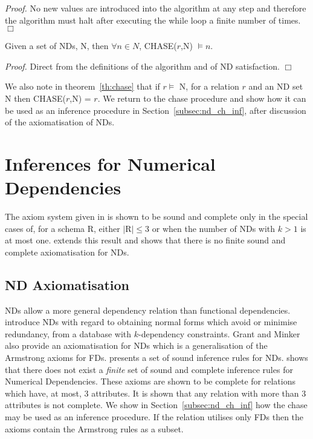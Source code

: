 {\em Proof.} No new values are introduced into the algorithm at any
step and therefore the algorithm must halt after executing the while
loop a finite number of times. $\Box$

\begin{theorem}\label{th:chase}
\begin{rm}
Given a set of NDs, N, then $\forall n \in N$, CHASE($r$,N) $\models n$.
\end{rm}
\end{theorem}

{\em Proof.} Direct from the definitions of the algorithm and of ND
satisfaction. $\Box$

We also note in theorem~\ref{th:chase} that if $r \models$ N, for a
relation $r$ and an ND set N then CHASE($r$,N) = $r$.
We return to the chase procedure and show how it can be used as an
inference procedure in Section~\ref{subsec:nd_ch_inf}, after discussion of the
axiomatisation of NDs.   

\section{Inferences for Numerical Dependencies}\label{sec:nd_inf}

The axiom system given in \cite{gm85a} is shown to be sound and
complete only in the special cases of, for a schema R, either $|$R$| \le 3$ or when the number of
NDs with $k > 1$ is at most one. \cite{gm85b} extends this result
and shows that there is no finite sound and complete
axiomatisation for NDs. 

\subsection{ND Axiomatisation}\label{subsec:nd_axiom}
NDs allow a more general dependency relation than functional
dependencies.  \cite{gm85a,gm85b} introduce NDs with regard
to obtaining normal forms which avoid or minimise redundancy, from a
database with $k$-dependency constraints. Grant and Minker also
provide an axiomatisation for NDs which is a
generalisation of the Armstrong axioms for 
FDs. \cite{gm85a} presents a set of sound
inference rules for NDs. \cite{gm85b} 
shows that there does not exist a {\em finite} set of sound and
complete inference rules for Numerical Dependencies.
These axioms are shown to be complete for relations which have, at most,
3 attributes.  It is shown that any relation with more than 3 attributes is
not complete. We show in Section~\ref{subsec:nd_ch_inf} how the chase may
be used as an inference procedure.
If the relation utilises only FDs then the axioms
contain the Armstrong rules as a subset.\\

